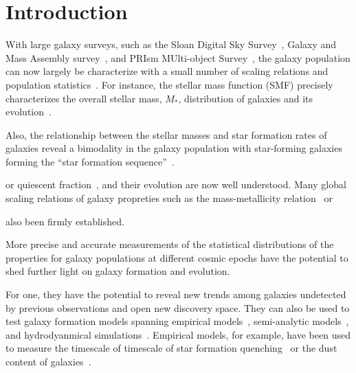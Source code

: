 \section{Introduction} \label{sec:intro} 
With large galaxy surveys, such as the Sloan Digital Sky
Survey~\citep[SDSS;][]{york2000}, Galaxy and Mass Assembly
survey~\citep[GAMA;][]{driver2011}, and 
PRIsm MUlti-object Survey~\citep[PRIMUS;][]{coil2011}, 
the galaxy population can now largely be characterize with a small number of
scaling relations and population 
statistics~\citep[see][for a review]{blanton2009}.
For instance, the stellar mass function (SMF) precisely characterizes the
overall stellar mass, $M_*$, distribution of galaxies and its
evolution~\citep{li2009, marchesini2009, moustakas2013, muzzin2013, leja2019a,
driver2022}.



Also, the relationship between the stellar masses and star formation rates of
galaxies reveal a bimodality in the galaxy population with star-forming
galaxies forming the ``star formation sequence''~\citep{noeske2007, daddi2007,
salim2007}.


or quiescent
fraction~\citep{kauffmann2003a, blanton2003, baldry2006, taylor2009}, and their
evolution are now well understood. 
Many global scaling relations of galaxy propreties such as the mass-metallicity
relation~\citep{tremonti2004} or

also been firmly established. 

More precise and accurate measurements of the statistical distributions of the
properties for galaxy populations at different cosmic epochs have the potential
to shed further light on galaxy formation and evolution. 

For one, they have the potential to reveal new trends among galaxies undetected
by previous observations and open new discovery space.
They can also be used to test galaxy formation models spanning 
empirical models~\citep[\emph{e.g.} {\sc UniverseMachine};][]{behroozi2019}, 
semi-analytic models~\citep[\emph{e.g.}][]{benson2012, henriques2015,
somerville2015}, and 
hydrodyanmical simulations~\citep[see][for a review]{somerville2015a}. 
Empirical models, for example, have been used to measure the timescale of 
timescale of star formation quenching~\citep{wetzel2013, hahn2017, tinker2017}
or the dust content of galaxies~\citep{hahn2021}. 

